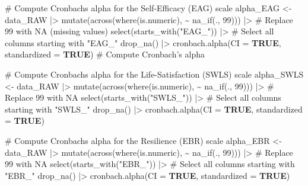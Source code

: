 \documentclass[
  bookmarksnumbered]{article}
\newenvironment{Shaded}{\begin{snugshade}}{\end{snugshade}}
\newcommand{\AttributeTok}[1]{\textcolor[rgb]{0.80,0.80,0.80}{#1}}
\newcommand{\CommentTok}[1]{\textcolor[rgb]{0.50,0.62,0.50}{#1}}
\newcommand{\ConstantTok}[1]{\textcolor[rgb]{0.86,0.64,0.64}{\textbf{#1}}}
\newcommand{\DecValTok}[1]{\textcolor[rgb]{0.86,0.86,0.80}{#1}}
\newcommand{\FunctionTok}[1]{\textcolor[rgb]{0.94,0.94,0.56}{#1}}
\newcommand{\NormalTok}[1]{\textcolor[rgb]{0.80,0.80,0.80}{#1}}
\newcommand{\OtherTok}[1]{\textcolor[rgb]{0.94,0.94,0.56}{#1}}
\newcommand{\SpecialCharTok}[1]{\textcolor[rgb]{0.86,0.64,0.64}{#1}}
\newcommand{\StringTok}[1]{\textcolor[rgb]{0.80,0.58,0.58}{#1}}
\begin{document}
\begin{Shaded}
\begin{Highlighting}[]
\CommentTok{\# Compute Cronbach\textquotesingle{}s alpha for the Self{-}Efficacy (EAG) scale}
\NormalTok{alpha\_EAG }\OtherTok{\textless{}{-}}\NormalTok{ data\_RAW }\SpecialCharTok{|\textgreater{}} 
  \FunctionTok{mutate}\NormalTok{(}\FunctionTok{across}\NormalTok{(}\FunctionTok{where}\NormalTok{(is.numeric), }\SpecialCharTok{\textasciitilde{}} \FunctionTok{na\_if}\NormalTok{(., }\DecValTok{99}\NormalTok{))) }\SpecialCharTok{|\textgreater{}}  \CommentTok{\# Replace 99 with NA (missing values)}
  \FunctionTok{select}\NormalTok{(}\FunctionTok{starts\_with}\NormalTok{(}\StringTok{"EAG\_"}\NormalTok{)) }\SpecialCharTok{|\textgreater{}}  \CommentTok{\# Select all columns starting with "EAG\_"}
  \FunctionTok{drop\_na}\NormalTok{() }\SpecialCharTok{|\textgreater{}}
  \FunctionTok{cronbach.alpha}\NormalTok{(}\AttributeTok{CI =} \ConstantTok{TRUE}\NormalTok{, }\AttributeTok{standardized =} \ConstantTok{TRUE}\NormalTok{)  }\CommentTok{\# Compute Cronbach’s alpha}

\CommentTok{\# Compute Cronbach\textquotesingle{}s alpha for the Life{-}Satisfaction (SWLS) scale}
\NormalTok{alpha\_SWLS }\OtherTok{\textless{}{-}}\NormalTok{ data\_RAW }\SpecialCharTok{|\textgreater{}} 
  \FunctionTok{mutate}\NormalTok{(}\FunctionTok{across}\NormalTok{(}\FunctionTok{where}\NormalTok{(is.numeric), }\SpecialCharTok{\textasciitilde{}} \FunctionTok{na\_if}\NormalTok{(., }\DecValTok{99}\NormalTok{))) }\SpecialCharTok{|\textgreater{}}  \CommentTok{\# Replace 99 with NA}
  \FunctionTok{select}\NormalTok{(}\FunctionTok{starts\_with}\NormalTok{(}\StringTok{"SWLS\_"}\NormalTok{)) }\SpecialCharTok{|\textgreater{}}  \CommentTok{\# Select all columns starting with "SWLS\_"}
  \FunctionTok{drop\_na}\NormalTok{() }\SpecialCharTok{|\textgreater{}}
  \FunctionTok{cronbach.alpha}\NormalTok{(}\AttributeTok{CI =} \ConstantTok{TRUE}\NormalTok{, }\AttributeTok{standardized =} \ConstantTok{TRUE}\NormalTok{)}

\CommentTok{\# Compute Cronbach\textquotesingle{}s alpha for the Resilience (EBR) scale}
\NormalTok{alpha\_EBR }\OtherTok{\textless{}{-}}\NormalTok{ data\_RAW }\SpecialCharTok{|\textgreater{}} 
  \FunctionTok{mutate}\NormalTok{(}\FunctionTok{across}\NormalTok{(}\FunctionTok{where}\NormalTok{(is.numeric), }\SpecialCharTok{\textasciitilde{}} \FunctionTok{na\_if}\NormalTok{(., }\DecValTok{99}\NormalTok{))) }\SpecialCharTok{|\textgreater{}}  \CommentTok{\# Replace 99 with NA}
  \FunctionTok{select}\NormalTok{(}\FunctionTok{starts\_with}\NormalTok{(}\StringTok{"EBR\_"}\NormalTok{)) }\SpecialCharTok{|\textgreater{}}  \CommentTok{\# Select all columns starting with "EBR\_"}
  \FunctionTok{drop\_na}\NormalTok{() }\SpecialCharTok{|\textgreater{}}
  \FunctionTok{cronbach.alpha}\NormalTok{(}\AttributeTok{CI =} \ConstantTok{TRUE}\NormalTok{, }\AttributeTok{standardized =} \ConstantTok{TRUE}\NormalTok{)}


\end{Highlighting}
\end{Shaded}
\end{document}
